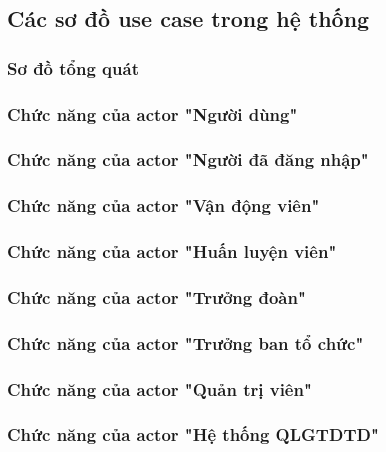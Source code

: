 \subsection{Các sơ đồ use case trong hệ thống}
\setcounter{subsubsection}{0}
\setcounter{figure}{0}

% 

\subsubsection{Sơ đồ tổng quát}

\subsubsection{Chức năng của actor "Người dùng"}

\subsubsection{Chức năng của actor "Người đã đăng nhập"}

\subsubsection{Chức năng của actor "Vận động viên"}

\subsubsection{Chức năng của actor "Huấn luyện viên"}

\subsubsection{Chức năng của actor "Trưởng đoàn"}

\subsubsection{Chức năng của actor "Trưởng ban tổ chức"}

\subsubsection{Chức năng của actor "Quản trị viên"}

\subsubsection{Chức năng của actor "Hệ thống QLGTDTD"}
